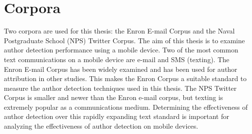 \section{Corpora} Two corpora are used for this thesis: the Enron E-mail Corpus and the Naval Postgraduate School (NPS) Twitter Corpus.  The aim of this thesis is to examine author detection performance using a mobile device.  Two of the most common text communications on a mobile device are e-mail and SMS (texting).  The Enron E-mail Corpus has been widely examined and has been used for author attribution in other studies.  This makes the Enron Corpus a suitable standard to measure the author detection techniques used in this thesis.  The NPS Twitter Corpus is smaller and newer than the Enron e-mail corpus, but texting is extremely popular as a communications medium.  Determining the effectiveness of author detection over this rapidly expanding text standard is important for analyzing the effectiveness of author detection on mobile devices.
